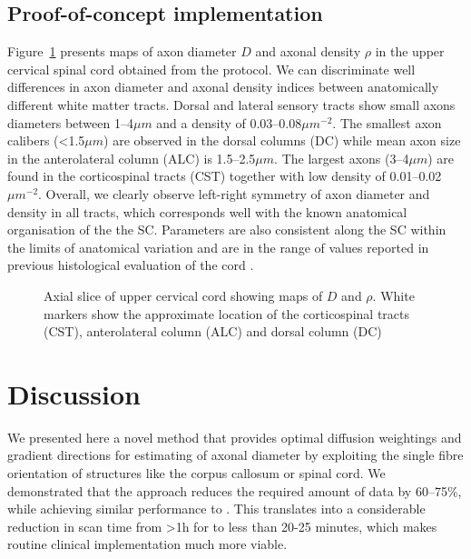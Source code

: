 \subsection{Proof-of-concept implementation}
Figure~\ref{fig:chapter7 exp1 monkey data} presents maps of axon diameter $D$ and axonal density $\rho$ in the upper cervical spinal cord obtained from the {\FD} protocol. We can discriminate well differences in axon diameter and axonal density indices between anatomically different white matter tracts. Dorsal and lateral sensory tracts show small axons diameters between 1--4$\mu m$ and a density of 0.03--0.08$\mu m^{-2}$. The smallest axon calibers (<1.5$\mu m$) are observed in the dorsal columns (DC) while mean axon size in the anterolateral column (ALC) is 1.5--2.5$\mu m$. The largest axons (3--4$\mu m$) are found in the corticospinal tracts (CST) together with low density of 0.01--0.02$\mu m^{-2}$. Overall, we clearly observe left-right symmetry of axon diameter and density in all tracts, which corresponds well with the known anatomical organisation of the the SC. Parameters are also consistent along the SC within the limits of anatomical variation and are in the range of values reported in previous histological evaluation of the cord \citep{GrafvonKeyserlingk:1984,Golabchi:2010}. 

\begin{figure}[ht]
	\centering
	\hspace{2cm}
	\caption{Axial slice of upper cervical cord showing maps of $D$ and $\rho$. White markers show the approximate location of the corticospinal tracts (CST), anterolateral column (ALC) and dorsal column (DC)}
	\label{fig:chapter7 exp1 monkey data}
\end{figure}

\section{Discussion}
We presented here a novel method that provides optimal diffusion weightings and gradient directions for estimating of axonal diameter by exploiting the single fibre orientation of structures like the corpus callosum or spinal cord. We demonstrated that the {\SF} approach reduces the required amount of data by 60--75\%, while achieving similar performance to {\OI}. This translates into a considerable reduction in scan time from >1h for {\OI} to less than 20-25 minutes, which makes routine clinical implementation much more viable.  

